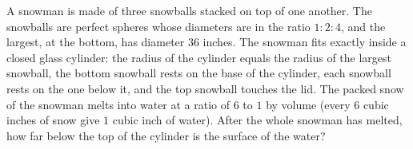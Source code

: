 A snowman is made of three snowballs stacked on top of one another. The snowballs are perfect spheres whose diameters are in the ratio $1:2:4$, and the largest, at the bottom, has diameter $36$ inches. The snowman fits exactly inside a closed glass cylinder: the radius of the cylinder equals the radius of the largest snowball, the bottom snowball rests on the base of the cylinder, each snowball rests on the one below it, and the top snowball touches the lid. The packed snow of the snowman melts into water at a ratio of $6$ to $1$ by volume (every $6$ cubic inches of snow give $1$ cubic inch of water). After the whole snowman has melted, how far below the top of the cylinder is the surface of the water?
